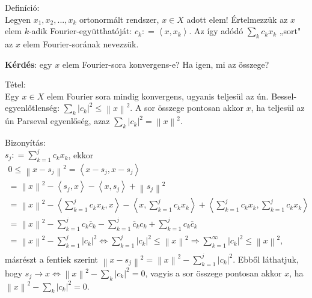 \documentclass[12pt,a4paper]{scrartcl}
\newenvironment{definicio}{}{}
\newenvironment{tetel}{}{}
\newenvironment{bizonyitas}{}{}
\begin{document}
\begin{definicio}

Definíció:\\
Legyen \(x_{1},x_{2},...,x_{k}\) ortonormált rendszer, \(x \in X\) adott
elem! Értelmezzük az \(x\) elem \(k\)-adik Fourier-együtthatóját:
\(c_{k}: = \left\langle {x,x_{k}} \right\rangle\). Az így adódó
\(\sum\limits_{k}{c_{k}x_{k}}\) „sort" az \(x\) elem Fourier-sorának
nevezzük.

\end{definicio}

\textbf{Kérdés}: egy \(x\) elem Fourier-sora konvergens-e? Ha igen, mi
az összege?

\begin{tetel}

Tétel:\\
Egy \(x \in X\) elem Fourier sora mindig konvergens, ugyanis teljesül az
ún. Bessel-egyenlőtlenség:
\({\sum\limits_{k}\left| c_{k} \right|^{2}} \leq \left\| x \right\|^{2}\).
A sor összege pontosan akkor \(x\), ha teljesül az ún Parseval
egyenlőség, azaz
\({\sum\limits_{k}\left| c_{k} \right|^{2}} = \left\| x \right\|^{2}\).

\end{tetel}

\begin{bizonyitas}

Bizonyítás:\\
\(s_{j}: = {\sum\limits_{k = 1}^{j}{c_{k}x_{k}}}\), ekkor
\[\begin{array}{l}
{0 \leq \left\| {x - s_{j}} \right\|^{2} = \left\langle {x - s_{j},x - s_{j}} \right\rangle} \\
{= \left\| x \right\|^{2} - \left\langle {s_{j},x} \right\rangle - \left\langle {x,s_{j}} \right\rangle + \left\| s_{j} \right\|^{2}} \\
{= \left\| x \right\|^{2} - \left\langle {\sum\limits_{k = 1}^{j}c_{k}x_{k},x} \right\rangle - \left\langle {x,\sum\limits_{k = 1}^{j}c_{k}x_{k}} \right\rangle + \left\langle {\sum\limits_{k = 1}^{j}c_{k}x_{k},\sum\limits_{k = 1}^{j}c_{k}x_{k}} \right\rangle} \\
{= \left\| x \right\|^{2} - \sum\limits_{k = 1}^{j}c_{k}{\overline{c}}_{k} - \sum\limits_{k = 1}^{j}{\overline{c}}_{k}c_{k} + \sum\limits_{k = 1}^{j}c_{k}{\overline{c}}_{k}} \\
\left. {}{} = \left\| x \right\|^{2} - \sum\limits_{k = 1}^{j}\left| c_{k} \right|^{2}\Leftrightarrow\sum\limits_{k = 1}^{j}\left| c_{k} \right|^{2} \leq \left\| x \right\|^{2}\Rightarrow\sum\limits_{k = 1}^{\infty}\left| c_{k} \right|^{2} \leq \left\| x \right\|^{2}, \right. \\
\end{array}\]másrészt a fentiek szerint
\(\left\| {x - s_{j}} \right\|^{2} = \left\| x \right\|^{2} - {\sum\limits_{k = 1}^{j}\left| c_{k} \right|^{2}}\).
Ebből láthatjuk, hogy
\(\left. s_{j}\rightarrow x\Leftrightarrow\left\| x \right\|^{2} - {\sum\limits_{k}\left| c_{k} \right|^{2}} = 0 \right.\),
vagyis a sor összege pontosan akkor \(x\), ha
\(\left\| x \right\|^{2} - {\sum\limits_{k}\left| c_{k} \right|^{2}} = 0\).

\end{bizonyitas}
\end{document}
